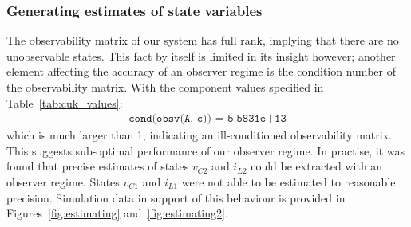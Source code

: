 \subsubsection{Generating estimates of state variables}\label{sec:observing}
The observability matrix of our system has full rank, implying that there are no unobservable states. This fact by itself is limited in its insight however; another element affecting the accuracy of an observer regime is the condition number of the observability matrix.
\newpar
With the component values specified in Table~\ref{tab:cuk_values}:
\begin{align}
\texttt{cond(obsv(A, c)) = 5.5831e+13}
\end{align}
which is much larger than 1, indicating an ill-conditioned observability matrix. This suggests sub-optimal performance of our observer regime.
\newpar
In practise, it was found that precise estimates of states $v_{C2}$ and $i_{L2}$ could be extracted with an observer regime. States $v_{C1}$ and $i_{L1}$ were not able to be estimated to reasonable precision. Simulation data in support of this behaviour is provided in Figures~\ref{fig:estimating} and~\ref{fig:estimating2}.
